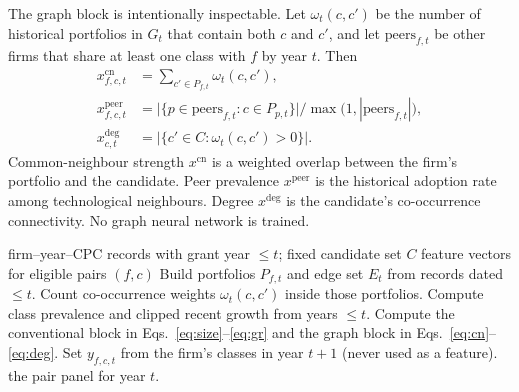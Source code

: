 \documentclass[preprint,12pt,3p]{elsarticle}
\begin{document}
The graph block is intentionally inspectable. Let $\omega_t(c,c')$ be the number of historical portfolios in $G_t$ that contain both $c$ and $c'$, and let $\mathrm{peers}_{f,t}$ be other firms that share at least one class with $f$ by year $t$. Then
\begin{align}
x^{\mathrm{cn}}_{f,c,t} &= \sum_{c'\in P_{f,t}}\omega_t(c,c'),
\label{eq:cn}\\
x^{\mathrm{peer}}_{f,c,t} &= \bigl|\{p\in\mathrm{peers}_{f,t}: c\in P_{p,t}\}\bigr|/\max\bigl(1,|\mathrm{peers}_{f,t}|\bigr),
\label{eq:peer}\\
x^{\mathrm{deg}}_{c,t} &= \bigl|\{c'\in C: \omega_t(c,c')>0\}\bigr|.
\label{eq:deg}
\end{align}
Common-neighbour strength $x^{\mathrm{cn}}$ is a weighted overlap between the firm's portfolio and the candidate. Peer prevalence $x^{\mathrm{peer}}$ is the historical adoption rate among technological neighbours. Degree $x^{\mathrm{deg}}$ is the candidate's co-occurrence connectivity. No graph neural network is trained.

\begin{algorithm}[t]
\caption{Leakage-aware feature construction at prediction year $t$}
\label{alg:features}
\begin{algorithmic}[1]
\Require firm--year--CPC records with grant year $\le t$; fixed candidate set $C$
\Ensure feature vectors for eligible pairs $(f,c)$
\State Build portfolios $P_{f,t}$ and edge set $E_t$ from records dated $\le t$.
\State Count co-occurrence weights $\omega_t(c,c')$ inside those portfolios.
\State Compute class prevalence and clipped recent growth from years $\le t$.
    \State Compute the conventional block in Eqs.~\eqref{eq:size}--\eqref{eq:gr} and the graph block in Eqs.~\eqref{eq:cn}--\eqref{eq:deg}.
    \State Set $y_{f,c,t}$ from the firm's classes in year $t+1$ (never used as a feature).
\EndFor
\State \Return the pair panel for year $t$.
\end{algorithmic}
\end{algorithm}
\end{document}
